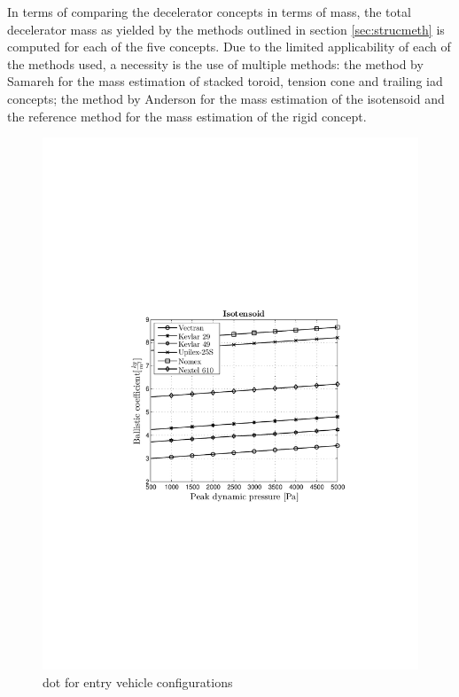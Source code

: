In terms of comparing the decelerator concepts in terms of mass, the total decelerator mass as yielded by the methods outlined in section \ref{sec:strucmeth} is computed for each of the five concepts. Due to the limited applicability of each of the methods used, a necessity is the use of multiple methods: the method by Samareh \cite{Samareh2011} for the mass estimation of stacked toroid, tension cone and trailing \gls{iad} concepts; the method by Anderson \cite{Anderson1969} for the mass estimation of the isotensoid and the reference method for the mass estimation of the rigid concept. 

\begin{figure}[H]
\includegraphics[width = 1.00\textwidth]{Figure/ISO_mat.pdf}
\caption{\acrlong{dot} for entry vehicle configurations}
\label{fig:dotshape}
\end{figure}

